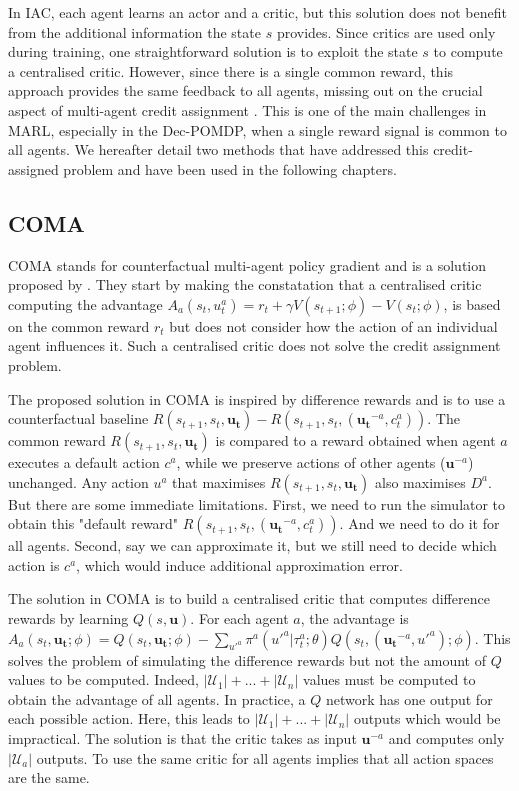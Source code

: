 In IAC, each agent learns an actor and a critic, but this solution does not benefit from the additional information the state $s$ provides.
Since critics are used only during training, one straightforward solution is to exploit the state $s$ to compute a centralised critic.
However, since there is a single common reward, this approach provides the same feedback to all agents, missing out on the crucial aspect of multi-agent credit assignment \citep{chang2003all}.
This is one of the main challenges in MARL, especially in the Dec-POMDP, when a single reward signal is common to all agents.
We hereafter detail two methods that have addressed this credit-assigned problem and have been used in the following chapters.

\subsection{COMA}
\label{sec:ch3_coma}

COMA stands for counterfactual multi-agent policy gradient and is a solution proposed by \cite{foerster2017coma}.
They start by making the constatation that a centralised critic computing the advantage $A_a(s_t, u^a_t) = r_t + \gamma V(s_{t+1}; \phi) - V(s_t; \phi)$, is based on the common reward $r_t$ but does not consider how the action of an individual agent influences it.
Such a centralised critic does not solve the credit assignment problem.

The proposed solution in COMA is inspired by difference rewards \citep{wolpert2001optimal} and is to use a counterfactual baseline $R(s_{t+1}, s_t, \boldsymbol {u_t}) - R(s_{t+1}, s_t, (\boldsymbol{u_t}^{-a}, c_t^a))$.
The common reward $R(s_{t+1}, s_t, \boldsymbol {u_t})$ is compared to a reward obtained when agent $a$ executes a default action $c^a$, while we preserve actions of other agents ($\mathbf{u}^{-a}$) unchanged.
Any action $u^a$ that maximises $R(s_{t+1}, s_t, \boldsymbol {u_t})$ also maximises $D^a$.
But there are some immediate limitations.
First, we need to run the simulator to obtain this "default reward" $R(s_{t+1}, s_t, (\boldsymbol{u_t}^{-a}, c_t^a))$.
And we need to do it for all agents.
Second, say we can approximate it, but we still need to decide which action is $c^a$, which would induce additional approximation error.

The solution in COMA is to build a centralised critic that computes difference rewards by learning $Q(s, \mathbf{u})$.
For each agent $a$, the advantage is $A_a(s_t,\boldsymbol{u_t}; \phi)=Q(s_t, \boldsymbol{u_t};\phi) - \sum_{u'^{a}} \pi^a({u'^{a}} |\tau_t^a;\theta) Q(s_t, (\boldsymbol{u_t}^{-a}, u'^{a}); \phi)$.
This solves the problem of simulating the difference rewards but not the amount of $Q$ values to be computed.
Indeed, $|\mathcal{U}_1|+...+|\mathcal{U}_n|$ values must be computed to obtain the advantage of all agents.
In practice, a $Q$ network has one output for each possible action.
Here, this leads to $|\mathcal{U}_1|+...+|\mathcal{U}_n|$ outputs which would be impractical.
The solution is that the critic takes as input $\boldsymbol{u}^{-a}$ and computes only $|\mathcal{U}_a|$ outputs.
To use the same critic for all agents implies that all action spaces are the same.

